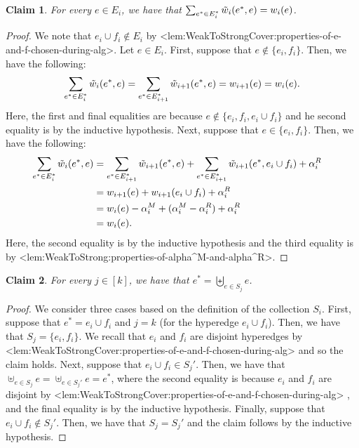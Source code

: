 \documentclass{article}
\def\Cref#1{<#1>}%
\newtheorem{claim}{Claim}[section]
\begin{document}
    \begin{claim}\label{claim:weak-to-strong:correctness:main:hyperedge-merge:property1}
        For every $e \in E_i$, we have that $\sum_{e^* \in E_i^*}\Tilde{w}_{i}(e^*, e) = w_i(e)$.
    \end{claim}
    \begin{proof}
        We note that $e_i \cup f_i \not \in E_i$ by \Cref{lem:WeakToStrongCover:properties-of-e-and-f-chosen-during-alg}. Let $e \in E_i$. First, suppose that $e \not \in \{e_i, f_i\}$. Then, we have the following:
        $$\sum_{e^* \in E_i^*}\Tilde{w}_{i}(e^*, e) = \sum_{e^* \in E_{i+1}^*}\Tilde{w}_{i+1}(e^*, e) = w_{i+1}(e) = w_i(e).$$
        Here, the first and final equalities are because $e \not \in \{e_i, f_i, e_i\cup f_i\}$ and he second equality is by the inductive hypothesis. Next, suppose that $e \in \{e_i, f_i\}$. Then, we have the following:
        \begin{align*}
            \sum_{e^* \in E_i^*}\Tilde{w}_i(e^*, e)&= \sum_{e^* \in E_{i+1}^*}\Tilde{w}_{i+1}(e^*, e) + \sum_{e^* \in E_{i+1}^*}\Tilde{w}_{i+1}(e^*, e_i\cup f_i) + \alpha_i^R&\\
            &= w_{i+1}(e) + w_{i+1}(e_i\cup f_i) + \alpha_i^R&\\
            & = w_i(e) - \alpha_i^M + (\alpha_i^M - \alpha_i^R) + \alpha_i^R&\\
            &= w_i(e).  &
        \end{align*}
        Here, the second equality is by the inductive hypothesis and the third equality is by \Cref{lem:WeakToStrong:properties-of-alpha^M-and-alpha^R}.
    \end{proof}

\begin{claim}\label{claim:weak-to-strong:correctness:main:hyperedge-merge:property2}
    For every $j \in [k]$, we have that $e^* = \biguplus_{e \in S_j}e$.
\end{claim}
\begin{proof}
    We consider three cases based on the definition of the collection $S_i$. First, suppose that $e^* = e_i \cup f_i$ and $j = k$ (for the hyperedge $e_i\cup f_i$). Then, we have that $S_j = \{e_i, f_i\}$. We recall that $e_i$ and $f_i$ are disjoint hyperedges by \Cref{lem:WeakToStrongCover:properties-of-e-and-f-chosen-during-alg} and so the claim holds. Next, suppose that $e_i \cup f_i \in S_j'$. Then, we have that $\uplus_{e \in S_j} e = \uplus_{e \in S_j'} e = e^*$, where the second equality is  because $e_i$ and $f_i$ are disjoint by \Cref{lem:WeakToStrongCover:properties-of-e-and-f-chosen-during-alg} , and the final equality is by the inductive hypothesis. Finally, suppose that $e_i\cup f_i \not \in S_j'$. Then, we have that $S_j = S_j'$ and the claim follows by the inductive hypothesis.
\end{proof}
\end{document}
